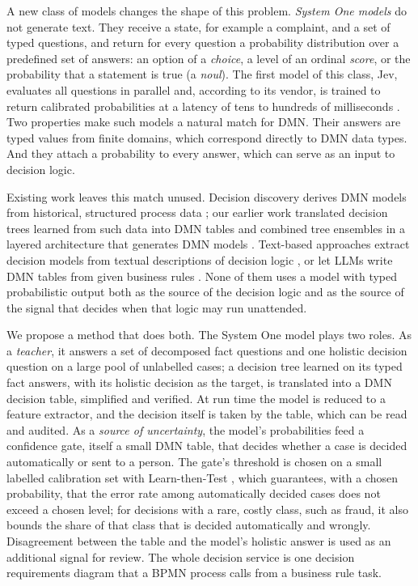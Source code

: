 \documentclass[a4paper,fleqn]{cas-sc}
\theoremstyle{definition}
\newcommand{\jev}{Jev}
\begin{document}
A new class of models changes the shape of this problem. \emph{System One models} \citep{typesafe2026docs} do not generate text. They receive a state, for example a complaint, and a set of typed questions, and return for every question a probability distribution over a predefined set of answers: an option of a \emph{choice}, a level of an ordinal \emph{score}, or the probability that a statement is true (a \emph{noul}). The first model of this class, \jev{}, evaluates all questions in parallel and, according to its vendor, is trained to return calibrated probabilities at a latency of tens to hundreds of milliseconds \citep{typesafe2026docs}. Two properties make such models a natural match for DMN. Their answers are typed values from finite domains, which correspond directly to DMN data types. And they attach a probability to every answer, which can serve as an input to decision logic.

Existing work leaves this match unused. Decision discovery derives DMN models from historical, structured process data \citep{bazhenova2016,desmedt2019,goossens2024,leewis2024}; our earlier work translated decision trees learned from such data into DMN tables \citep{etinger2019} and combined tree ensembles in a layered architecture that generates DMN models \citep{simic2020}. Text-based approaches extract decision models from textual descriptions of decision logic \citep{goossens2023}, or let LLMs write DMN tables from given business rules \citep{cherednichenko2025}. None of them uses a model with typed probabilistic output both as the source of the decision logic and as the source of the signal that decides when that logic may run unattended.

We propose a method that does both. The System One model plays two roles. As a \emph{teacher}, it answers a set of decomposed fact questions and one holistic decision question on a large pool of unlabelled cases; a decision tree learned on its typed fact answers, with its holistic decision as the target, is translated into a DMN decision table, simplified and verified. At run time the model is reduced to a feature extractor, and the decision itself is taken by the table, which can be read and audited. As a \emph{source of uncertainty}, the model's probabilities feed a confidence gate, itself a small DMN table, that decides whether a case is decided automatically or sent to a person. The gate's threshold is chosen on a small labelled calibration set with Learn-then-Test \citep{angelopoulos2025ltt}, which guarantees, with a chosen probability, that the error rate among automatically decided cases does not exceed a chosen level; for decisions with a rare, costly class, such as fraud, it also bounds the share of that class that is decided automatically and wrongly. Disagreement between the table and the model's holistic answer is used as an additional signal for review. The whole decision service is one decision requirements diagram that a BPMN process calls from a business rule task.
\end{document}
